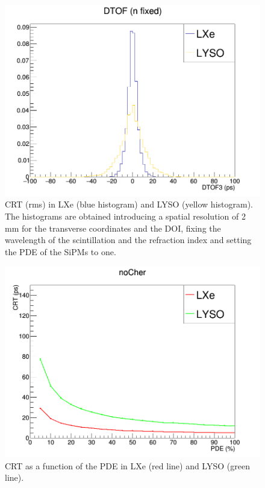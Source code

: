 \documentclass[review]{elsarticle}
\begin{document}
\begin{figure}[!bhtp]
	\centering
	\includegraphics[scale=0.5]{../img/DTOFLXeLYSO.png}
	\caption{\label{fig.dtof} CRT (rms) in LXe (blue histogram) and LYSO (yellow histogram). The
	histograms are obtained introducing a spatial resolution of 2 mm for the transverse coordinates and
	the DOI, fixing the wavelength of the scintillation and the refraction index and setting the PDE of the SiPMs to one. }
\end{figure}

\begin{figure}[!bhtp]
	\centering
	\includegraphics[scale=0.5]{../img/CRTvsPDELXeLYSONoJitterFstPE.png}
	\caption{\label{fig.crt1} CRT as a function of the PDE in LXe (red line) and LYSO (green line). }
\end{figure}
\end{document}
